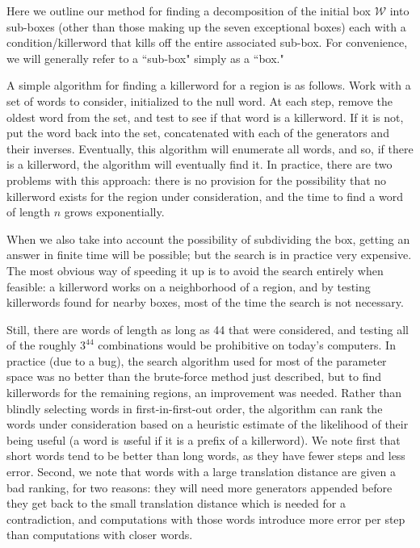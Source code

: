 \begin{remark}\label{GMT1.34}
Here we outline our method for finding a decomposition of the initial box ${\mathcal W}$ into sub-boxes (other than those making up the
 seven exceptional boxes)
each with a condition/killerword that kills off the entire associated sub-box.
For convenience, we will generally refer to a ``sub-box" simply as a ``box."

A simple algorithm for finding a killerword for a region is as follows.
Work with a set of words to consider, initialized to the null word.  At 
each step, remove the oldest word from the set, and test to see if that 
word is a killerword.
If it is not, put the word back into the set, concatenated with each of 
the generators and their inverses.
Eventually, this algorithm will enumerate all words, and so, if there 
is a killerword, the algorithm will eventually find it.  In practice, 
there are two problems with this approach: there is no provision for the possibility that no killerword exists for the region under consideration, 
and the time to find a word of length $n$ grows exponentially.

When we also take into account the possibility of subdividing the box, getting an answer in finite time will be possible; but the search is in practice 
very expensive.  The most obvious way of speeding it up is to avoid 
the search entirely when feasible: a killerword works on a neighborhood of a 
region, and by testing killerwords found for nearby boxes, most of 
the time the search is not necessary.

Still, there are words of length as long as 44 that were considered, and testing all of the roughly $3^{44}$ 
combinations would be prohibitive on today's computers.  In practice 
(due to a bug), the search algorithm used for most of the parameter
space was no better than the brute-force method just described, but to find 
killerwords for the remaining regions, an improvement was needed.  
Rather than blindly selecting words in first-in-first-out order, 
the algorithm can
rank the words under consideration based on a heuristic estimate of 
the likelihood of their being useful (a word is {\textit useful} if it is a prefix of a killerword).  
We note first that short words tend to be better than 
long words, as they have fewer steps and less error.
Second, we note that words 
with a large translation distance are given a bad ranking, for two reasons: 
they will need more generators appended before they get back to the 
small translation distance which is needed for a contradiction, and
 computations with those words introduce more error per step than 
computations with closer words.  


\end{remark}
